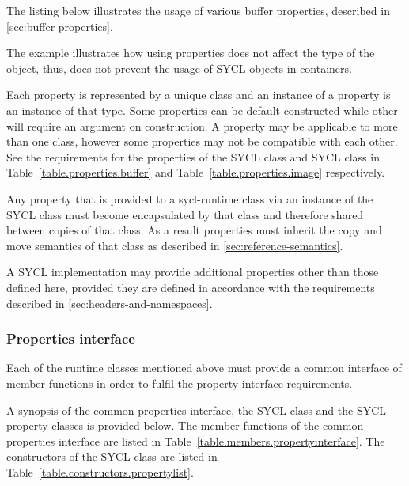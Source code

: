 The listing below illustrates the usage of various buffer properties, described in \ref{sec:buffer-properties}.

The example illustrates how using properties does not affect the type
of the object, thus, does not prevent the usage of SYCL objects in
containers.



Each property is represented by a unique class and an instance of a property is an instance of that type. Some properties can be default constructed while other will require an argument on construction. A property may be applicable to more than one class, however some properties may not be compatible with each other. See the requirements for the properties of the SYCL  class and SYCL  class in Table~\ref{table.properties.buffer} and Table~\ref{table.properties.image} respectively.

Any property that is provided to a \gls{sycl-runtime} class via an instance of the SYCL  class must become encapsulated by that class and therefore shared between copies of that class. As a result properties must inherit the copy and move semantics of that class as described in \ref{sec:reference-semantics}.

A SYCL implementation may provide additional properties other than those defined here, provided they are defined in accordance with the requirements described in \ref{sec:headers-and-namespaces}.

\subsubsection{Properties interface}

Each of the runtime classes mentioned above must provide a common interface of member functions in order to fulfil the property interface requirements.

A synopsis of the common properties interface, the SYCL  class and the SYCL property classes is provided below. The member functions of the common properties interface are listed in Table~\ref{table.members.propertyinterface}. The constructors of the SYCL  class are listed in Table~\ref{table.constructors.propertylist}.



